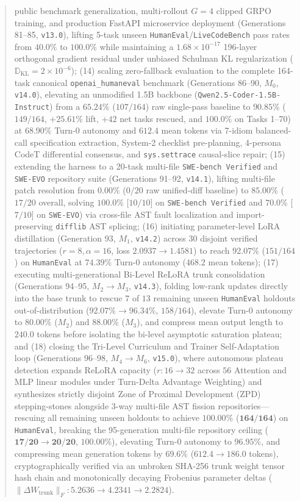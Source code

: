 \documentclass[10pt,twocolumn,letterpaper]{article}
\begin{document}
\begin{abstract}
public benchmark generalization, multi-rollout $G=4$ clipped GRPO training, and production FastAPI microservice deployment (Generations 81--85, \texttt{v13.0}), lifting 5-task unseen \texttt{HumanEval}/\texttt{LiveCodeBench} pass rates from $40.0\%$ to $100.0\%$ while maintaining a $1.68\times 10^{-17}$ 196-layer orthogonal gradient residual under unbiased Schulman KL regularization ($\mathbb{D}_{\text{KL}}=2\times 10^{-6}$); (14) scaling zero-fallback evaluation to the complete 164-task canonical \texttt{openai\_humaneval} benchmark (Generations 86--90, $M_{0}$, \texttt{v14.0}), elevating an unmodified 1.5B backbone (\texttt{Qwen2.5-Coder-1.5B-Instruct}) from a $65.24\%$ ($107/164$) raw single-pass baseline to $90.85\%$ ($149/164$, $+25.61\%$ lift, $+42$ net tasks rescued, and $100.0\%$ on Tasks 1--70) at $68.90\%$ Turn-0 autonomy and $612.4$ mean tokens via 7-idiom balanced-call specification extraction, System-2 checklist pre-planning, 4-persona CodeT differential consensus, and \texttt{sys.settrace} causal-slice repair; (15) extending the harness to a 20-task multi-file \texttt{SWE-bench Verified} and \texttt{SWE-EVO} repository suite (Generations 91--92, \texttt{v14.1}), lifting multi-file patch resolution from $0.00\%$ ($0/20$ raw unified-diff baseline) to $85.00\%$ ($17/20$ overall, solving $100.0\%$ [$10/10$] on \texttt{SWE-bench Verified} and $70.0\%$ [$7/10$] on \texttt{SWE-EVO}) via cross-file AST fault localization and import-preserving \texttt{difflib} AST splicing; (16) initiating parameter-level LoRA distillation (Generation 93, $M_{1}$, \texttt{v14.2}) across $30$ disjoint verified trajectories ($r=8, \alpha=16$, loss $2.0937\to 1.4581$) to reach $92.07\%$ ($151/164$) on \texttt{HumanEval} at $74.39\%$ Turn-0 autonomy ($468.2$ mean tokens); (17) executing multi-generational Bi-Level ReLoRA trunk consolidation (Generations 94--95, $M_{2}\to M_{3}$, \texttt{v14.3}), folding low-rank updates directly into the base trunk to rescue $7$ of $13$ remaining unseen \texttt{HumanEval} holdouts out-of-distribution ($92.07\%\to 96.34\%$, $158/164$), elevate Turn-0 autonomy to $80.00\%$ ($M_{2}$) and $88.00\%$ ($M_{3}$), and compress mean output length to $240.0$ tokens before isolating the bi-level asymptotic saturation plateau; and (18) closing the Tri-Level Curriculum and Trainer Self-Adaptation loop (Generations 96--98, $M_{4}\to M_{6}$, \texttt{v15.0}), where autonomous plateau detection expands ReLoRA capacity ($r: 16\to 32$ across $56$ Attention and MLP linear modules under Turn-Delta Advantage Weighting) and synthesizes strictly disjoint Zone of Proximal Development (ZPD) stepping-stones alongside 3-way multi-file AST fission repositories---rescuing all remaining unseen holdouts to achieve $\mathbf{100.00\%}$ ($\mathbf{164/164}$) on \texttt{HumanEval}, breaking the 95-generation multi-file repository ceiling ($\mathbf{17/20\to 20/20}$, $\mathbf{100.00\%}$), elevating Turn-0 autonomy to $\mathbf{96.95\%}$, and compressing mean generation tokens by $\mathbf{69.6\%}$ ($612.4\to 186.0$ tokens), cryptographically verified via an unbroken SHA-256 trunk weight tensor hash chain and monotonically decaying Frobenius parameter deltas ($\|\Delta W_{\text{trunk}}\|_{F}: 5.2636\to 4.2341\to 2.2824$).
\end{abstract}
\end{document}
